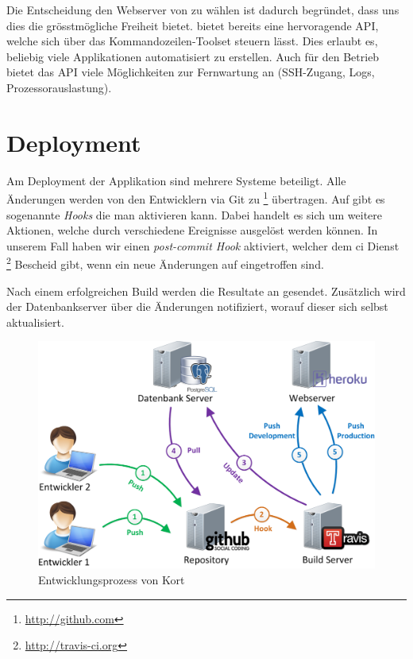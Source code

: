 Die Entscheidung den Webserver von  zu wählen ist dadurch begründet, dass uns dies die grösstmögliche Freiheit bietet. 
 bietet bereits eine hervoragende \gls{API}, welche sich über das Kommandozeilen-Toolset  steuern lässt.
Dies erlaubt es, beliebig viele Applikationen automatisiert zu erstellen.
Auch für den Betrieb bietet das \gls{API} viele Möglichkeiten zur Fernwartung an (SSH-Zugang, Logs, Prozessorauslastung).

\section{Deployment}
Am Deployment der Applikation sind mehrere Systeme beteiligt. 
Alle Änderungen werden von den Entwicklern via \gls{Git} zu \footnote{\url{http://github.com}} übertragen. 
Auf  gibt es sogenannte \emph{Hooks} die man aktivieren kann. 
Dabei handelt es sich um weitere Aktionen, welche durch verschiedene Ereignisse ausgelöst werden können. 
In unserem Fall haben wir einen \emph{post-commit Hook} aktiviert, welcher dem \gls{ci} Dienst \footnote{\url{http://travis-ci.org}} Bescheid gibt, wenn ein neue Änderungen auf  eingetroffen sind.

Nach einem erfolgreichen Build werden die Resultate an  gesendet.
Zusätzlich wird der Datenbankserver über die Änderungen notifiziert, worauf dieser sich selbst aktualisiert.

\begin{figure}[H]
	\centering
	\includegraphics[scale=0.35]{images/implementation/backend/kort-development}
	\caption{Entwicklungsprozess von Kort}
	\label{image-kort-development}
\end{figure}

